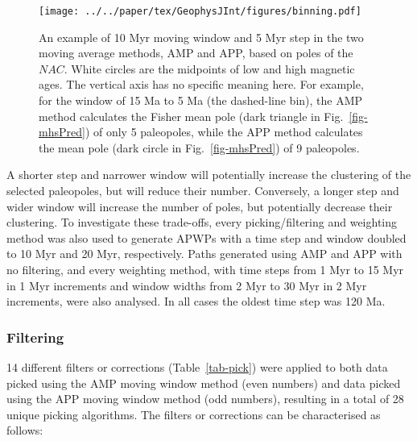 \begin{figure}[!ht]
\centering
\texttt{[image: ../../paper/tex/GeophysJInt/figures/binning.pdf]}
\caption[How moving average methods work]{An example of 10 Myr moving
window and 5 Myr step in the two moving average methods, AMP and APP, based on
poles of the $NAC$. White circles are the midpoints of low and high magnetic
ages. The vertical axis has no specific meaning here. For example, for the
window of 15 Ma to 5 Ma (the dashed-line bin), the AMP method calculates the
Fisher mean pole (dark triangle in Fig.~\ref{fig-mhsPred}) of only 5 paleopoles,
while the APP method calculates the mean pole (dark circle in
Fig.~\ref{fig-mhsPred}) of 9 paleopoles.}\label{fig-nac-maplat}
\end{figure}

A shorter step and narrower window will potentially increase the clustering of
the selected paleopoles, but will reduce their number. Conversely, a longer step
and wider window will increase the number of poles, but potentially decrease
their clustering. To investigate these trade-offs, every picking/filtering and
weighting method was also used to generate APWPs with a time step and window
doubled to 10 Myr and 20 Myr, respectively. Paths generated using AMP and APP
with no filtering, and every weighting method, with time steps from 1 Myr to 15
Myr in 1 Myr increments and window widths from 2 Myr to 30 Myr in 2 Myr
increments, were also analysed. In all cases the oldest time step was 120 Ma.

\subsubsection{Filtering}\label{sec:f}

14 different filters or corrections (Table~\ref{tab-pick}) were applied to both
data picked using the AMP moving window method (even numbers) and data picked
using the APP moving window method (odd numbers), resulting in a total of 28
unique picking algorithms. The filters or corrections can be characterised as
follows:

